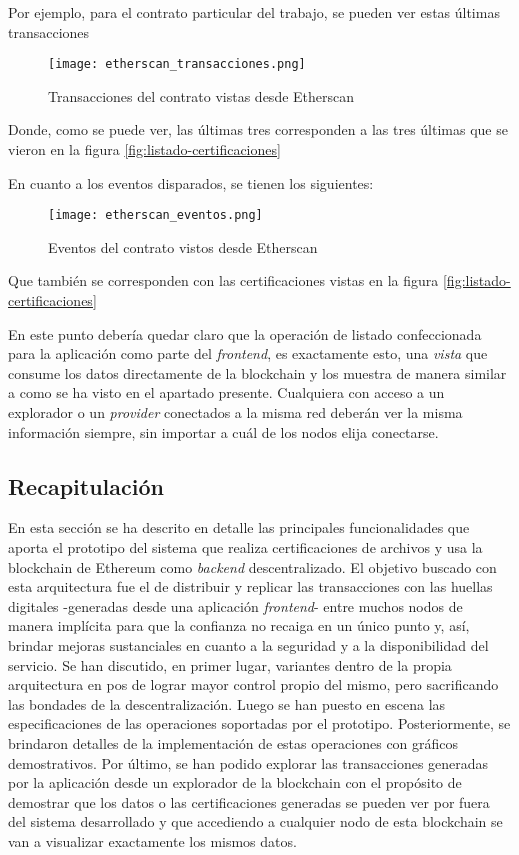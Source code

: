 Por ejemplo, para el contrato particular del trabajo, se pueden ver estas últimas transacciones

\begin{figure}[H]
  \texttt{[image: etherscan\_transacciones.png]}
  \centering
  \caption{Transacciones del contrato vistas desde Etherscan}
  \label{fig:etherscan-transacciones}
\end{figure}

Donde, como se puede ver, las últimas tres corresponden a las tres últimas que se vieron en la figura \ref{fig:listado-certificaciones}

En cuanto a los eventos disparados, se tienen los siguientes:

\begin{figure}[H]
  \texttt{[image: etherscan\_eventos.png]}
  \centering
  \caption{Eventos del contrato vistos desde Etherscan}
  \label{fig:etherscan-eventos}
\end{figure}

Que también se corresponden con las certificaciones vistas en la figura \ref{fig:listado-certificaciones}

En este punto debería quedar claro que la operación de listado confeccionada para la aplicación como parte del \textit{frontend}, es exactamente esto, una \textit{vista} que consume los datos directamente de la blockchain y los muestra de manera similar a como se ha visto en el apartado presente. Cualquiera con acceso a un explorador o un \textit{provider} conectados a la misma red deberán ver la misma información siempre, sin importar a cuál de los nodos elija conectarse.

\subsection{Recapitulación}
\label{recapitulacion_impl_solucion}

En esta sección se ha descrito en detalle las principales funcionalidades que aporta el prototipo del sistema que realiza certificaciones de archivos y usa la blockchain de Ethereum como \textit{backend} descentralizado. El objetivo buscado con esta arquitectura fue el de distribuir y replicar las transacciones con las huellas digitales -generadas desde una aplicación \textit{frontend}-  entre muchos nodos de manera implícita para que la confianza no recaiga en un único punto y, así, brindar mejoras sustanciales en cuanto a la seguridad y a la disponibilidad del servicio.
Se han discutido, en primer lugar, variantes dentro de la propia arquitectura en pos de lograr mayor control propio del mismo, pero sacrificando las bondades de la descentralización. Luego se han puesto en escena las especificaciones de las operaciones soportadas por el prototipo. Posteriormente, se brindaron detalles de la implementación de estas operaciones con gráficos demostrativos. Por último, se han podido explorar las transacciones generadas por la aplicación desde un explorador de la blockchain con el propósito de demostrar que los datos o las certificaciones generadas se pueden ver por fuera del sistema desarrollado y que accediendo a cualquier nodo de esta blockchain se van a visualizar exactamente los mismos datos.
